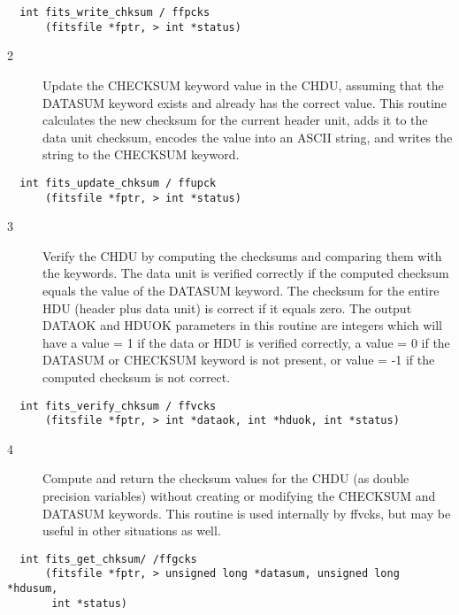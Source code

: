 \begin{verbatim}
  int fits_write_chksum / ffpcks
      (fitsfile *fptr, > int *status)
\end{verbatim}

\begin{description}
\item[2 ] Update the CHECKSUM keyword value in the CHDU, assuming that the
    DATASUM keyword exists and already has the correct value.  This routine
    calculates the new checksum for the current header unit, adds it to the
    data unit checksum, encodes the value into an ASCII string, and writes
   the string to the CHECKSUM keyword.
\end{description}

\begin{verbatim}
  int fits_update_chksum / ffupck
      (fitsfile *fptr, > int *status)
\end{verbatim}

\begin{description}
\item[3 ] Verify the CHDU by computing the checksums and comparing
    them with the keywords.  The data unit is verified correctly
    if the computed checksum equals the value of the DATASUM
    keyword.  The checksum for the entire HDU (header plus data unit) is
    correct if it equals zero.  The output DATAOK and HDUOK parameters
    in this routine are integers which will have a value = 1
    if the data or HDU is verified correctly, a value = 0
    if the DATASUM or CHECKSUM keyword is not present, or value = -1
   if the computed checksum is not correct.
\end{description}

\begin{verbatim}
  int fits_verify_chksum / ffvcks
      (fitsfile *fptr, > int *dataok, int *hduok, int *status)
\end{verbatim}

\begin{description}
\item[4 ] Compute and return the checksum values for the CHDU (as
    double precision variables) without creating or modifying the
    CHECKSUM and DATASUM keywords.  This routine is used internally by
   ffvcks, but may be useful in other situations as well.
\end{description}

\begin{verbatim}
  int fits_get_chksum/ /ffgcks
      (fitsfile *fptr, > unsigned long *datasum, unsigned long *hdusum,
       int *status)
\end{verbatim}

